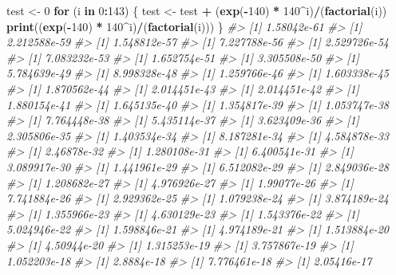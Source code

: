 \documentclass[]{article}
\newenvironment{Shaded}{\begin{snugshade}}{\end{snugshade}}
\newcommand{\CommentTok}[1]{\textcolor[rgb]{0.56,0.35,0.01}{\textit{#1}}}
\newcommand{\ControlFlowTok}[1]{\textcolor[rgb]{0.13,0.29,0.53}{\textbf{#1}}}
\newcommand{\DecValTok}[1]{\textcolor[rgb]{0.00,0.00,0.81}{#1}}
\newcommand{\KeywordTok}[1]{\textcolor[rgb]{0.13,0.29,0.53}{\textbf{#1}}}
\newcommand{\NormalTok}[1]{#1}
\newcommand{\OperatorTok}[1]{\textcolor[rgb]{0.81,0.36,0.00}{\textbf{#1}}}
\newcommand{\StringTok}[1]{\textcolor[rgb]{0.31,0.60,0.02}{#1}}
\begin{document}
\begin{Shaded}
\begin{Highlighting}[]
\NormalTok{test <-}\StringTok{ }\DecValTok{0}
\ControlFlowTok{for}\NormalTok{ (i }\ControlFlowTok{in} \DecValTok{0}\OperatorTok{:}\DecValTok{143}\NormalTok{) \{}
\NormalTok{    test <-}\StringTok{ }\NormalTok{test }\OperatorTok{+}\StringTok{ }\NormalTok{(}\KeywordTok{exp}\NormalTok{(}\OperatorTok{-}\DecValTok{140}\NormalTok{) }\OperatorTok{*}\StringTok{ }\DecValTok{140}\OperatorTok{^}\NormalTok{i)}\OperatorTok{/}\NormalTok{(}\KeywordTok{factorial}\NormalTok{(i))}
    \KeywordTok{print}\NormalTok{((}\KeywordTok{exp}\NormalTok{(}\OperatorTok{-}\DecValTok{140}\NormalTok{) }\OperatorTok{*}\StringTok{ }\DecValTok{140}\OperatorTok{^}\NormalTok{i)}\OperatorTok{/}\NormalTok{(}\KeywordTok{factorial}\NormalTok{(i)))}
\NormalTok{\}}
\CommentTok{#> [1] 1.58042e-61}
\CommentTok{#> [1] 2.212588e-59}
\CommentTok{#> [1] 1.548812e-57}
\CommentTok{#> [1] 7.227788e-56}
\CommentTok{#> [1] 2.529726e-54}
\CommentTok{#> [1] 7.083232e-53}
\CommentTok{#> [1] 1.652754e-51}
\CommentTok{#> [1] 3.305508e-50}
\CommentTok{#> [1] 5.784639e-49}
\CommentTok{#> [1] 8.998328e-48}
\CommentTok{#> [1] 1.259766e-46}
\CommentTok{#> [1] 1.603338e-45}
\CommentTok{#> [1] 1.870562e-44}
\CommentTok{#> [1] 2.014451e-43}
\CommentTok{#> [1] 2.014451e-42}
\CommentTok{#> [1] 1.880154e-41}
\CommentTok{#> [1] 1.645135e-40}
\CommentTok{#> [1] 1.354817e-39}
\CommentTok{#> [1] 1.053747e-38}
\CommentTok{#> [1] 7.764448e-38}
\CommentTok{#> [1] 5.435114e-37}
\CommentTok{#> [1] 3.623409e-36}
\CommentTok{#> [1] 2.305806e-35}
\CommentTok{#> [1] 1.403534e-34}
\CommentTok{#> [1] 8.187281e-34}
\CommentTok{#> [1] 4.584878e-33}
\CommentTok{#> [1] 2.46878e-32}
\CommentTok{#> [1] 1.280108e-31}
\CommentTok{#> [1] 6.400541e-31}
\CommentTok{#> [1] 3.089917e-30}
\CommentTok{#> [1] 1.441961e-29}
\CommentTok{#> [1] 6.512082e-29}
\CommentTok{#> [1] 2.849036e-28}
\CommentTok{#> [1] 1.208682e-27}
\CommentTok{#> [1] 4.976926e-27}
\CommentTok{#> [1] 1.99077e-26}
\CommentTok{#> [1] 7.741884e-26}
\CommentTok{#> [1] 2.929362e-25}
\CommentTok{#> [1] 1.079238e-24}
\CommentTok{#> [1] 3.874189e-24}
\CommentTok{#> [1] 1.355966e-23}
\CommentTok{#> [1] 4.630129e-23}
\CommentTok{#> [1] 1.543376e-22}
\CommentTok{#> [1] 5.024946e-22}
\CommentTok{#> [1] 1.598846e-21}
\CommentTok{#> [1] 4.974189e-21}
\CommentTok{#> [1] 1.513884e-20}
\CommentTok{#> [1] 4.50944e-20}
\CommentTok{#> [1] 1.315253e-19}
\CommentTok{#> [1] 3.757867e-19}
\CommentTok{#> [1] 1.052203e-18}
\CommentTok{#> [1] 2.8884e-18}
\CommentTok{#> [1] 7.776461e-18}
\CommentTok{#> [1] 2.05416e-17}

\end{Highlighting}
\end{Shaded}
\end{document}
